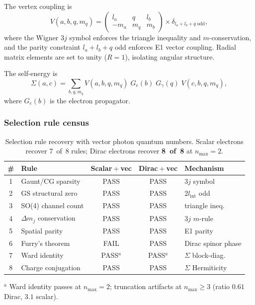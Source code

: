 \documentclass[11pt]{article}
\begin{document}
The vertex coupling is
\begin{equation}
  V(a, b, q, m_q) = \begin{pmatrix} l_a & q & l_b \\ -m_a & m_q & m_b \end{pmatrix}
  \times \delta_{l_a + l_b + q \;\mathrm{odd}},
  \label{eq:vector_vertex}
\end{equation}
where the Wigner 3$j$ symbol enforces the triangle inequality and
$m$-conservation, and the parity constraint $l_a + l_b + q$ odd
enforces E1 vector coupling.  Radial matrix elements are set to unity
($R = 1$), isolating angular structure.

The self-energy is
\begin{equation}
  \Sigma(a, c) = \sum_{b, q, m_q} V(a, b, q, m_q)\; G_e(b)\; G_\gamma(q)
  \; V(c, b, q, m_q),
  \label{eq:vector_self_energy}
\end{equation}
where $G_e(b)$ is the electron propagator.

\subsubsection{Selection rule census}

\begin{table}[h]
\centering
\caption{Selection rule recovery with vector photon quantum numbers.
Scalar electrons recover 7~of~8 rules; Dirac electrons recover
\textbf{8~of~8} at $n_{\max} = 2$.}
\label{tab:vector_selection_rules}
\begin{ruledtabular}
\begin{tabular}{clccl}
\# & Rule & Scalar${}+{}$vec & Dirac${}+{}$vec & Mechanism \\
\hline
1 & Gaunt/CG sparsity & PASS & PASS & 3$j$ symbol \\
2 & GS structural zero & PASS & PASS & $2l_{\mathrm{int}}$ odd \\
3 & SO(4) channel count & PASS & PASS & triangle ineq. \\
4 & $\Delta m_j$ conservation & PASS & PASS & 3$j$ $m$-rule \\
5 & Spatial parity & PASS & PASS & E1 parity \\
6 & Furry's theorem & FAIL & PASS & Dirac spinor phase \\
7 & Ward identity & PASS${}^a$ & PASS${}^a$ & $\Sigma$ block-diag. \\
8 & Charge conjugation & PASS & PASS & $\Sigma$ Hermiticity \\
\end{tabular}
\end{ruledtabular}
\raggedright ${}^a$ Ward identity passes at $n_{\max} = 2$;
truncation artifacts at $n_{\max} \geq 3$ (ratio $0.61$ Dirac,
$3.1$ scalar).
\end{table}
\end{document}
